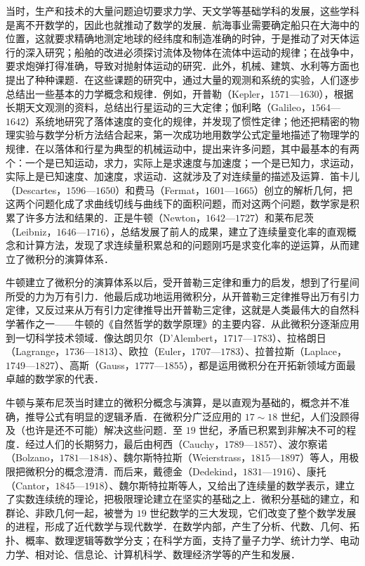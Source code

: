 当时，生产和技术的大量问题迫切要求力学、天文学等基础学科的发展，这些学科是离不开数学的，因此也就推动了数学的发展．航海事业需要确定船只在大海中的位置，这就要求精确地测定地球的经纬度和制造准确的时钟，于是推动了对天体运行的深入研究；船舶的改进必须探讨流体及物体在流体中运动的规律；在战争中，要求炮弹打得准确，导致对抛射体运动的研究．此外，机械、建筑、水利等方面也提出了种种课题．在这些课题的研究中，通过大量的观测和系统的实验，人们逐步总结出一些基本的力学概念和规律．例如，开普勒（Kepler，$1571$—$1630$），根据长期天文观测的资料，总结出行星运动的三大定律；伽利略（Galileo，$1564$—$1642$）系统地研究了落体速度的变化的规律，并发现了惯性定律；他还把精密的物理实验与数学分析方法结合起来，第一次成功地用数学公式定量地描述了物理学的规律．在以落体和行星为典型的机械运动中，提出来许多问题，其中最基本的有两个：一个是已知运动，求力，实际上是求速度与加速度；一个是已知力，求运动，实际上是已知速度、加速度，求运动．这就涉及了对连续量的描述及运算．笛卡儿（Descartes，$1596$—$1650$）和费马（Fermat，$1601$—$1665$）创立的解析几何，把这两个问题化成了求曲线切线与曲线下的面积问题，而对这两个问题，数学家是积累了许多方法和结果的．正是牛顿（Newton，$1642$—$1727$）和莱布尼茨（Leibniz，$1646$—$1716$），总结发展了前人的成果，建立了连续量变化率的直观概念和计算方法，发现了求连续量积累总和的问题刚巧是求变化率的逆运算，从而建立了微积分的演算体系．

牛顿建立了微积分的演算体系以后，受开普勒三定律和重力的启发，想到了行星间所受的力为万有引力．他最后成功地运用微积分，从开普勒三定律推导出万有引力定律，又反过来从万有引力定律推导出开普勒三定律，这就是人类最伟大的自然科学著作之一——牛顿的《自然哲学的数学原理》的主要内容．从此微积分逐渐应用到一切科学技术领域．像达朗贝尔（D'Alembert，$1717$—$1783$）、拉格朗日（Lagrange，$1736$—$1813$）、欧拉（Euler，$1707$—$1783$）、拉普拉斯（Laplace，$1749$—$1827$）、高斯（Gauss，$1777$—$1855$），都是运用微积分在开拓新领域方面最卓越的数学家的代表．

牛顿与莱布尼茨当时建立的微积分概念与演算，是以直观为基础的，概念并不准确，推导公式有明显的逻辑矛盾．在微积分广泛应用的 $17\sim18$ 世纪，人们没顾得及（也许是还不可能）解决这些问题．至 $19$ 世纪，矛盾已积累到非解决不可的程度．经过人们的长期努力，最后由柯西（Cauchy，$1789$—$1857$）、波尔察诺（Bolzano，$1781$—$1848$）、魏尔斯特拉斯（Weierstrass，$1815$—$1897$）等人，用极限把微积分的概念澄清．而后来，戴德金（Dedekind，$1831$—$1916$）、康托（Cantor，$1845$—$1918$）、魏尔斯特拉斯等人，又给出了连续量的数学表示，建立了实数连续统的理论，把极限理论建立在坚实的基础之上．微积分基础的建立，和群论、非欧几何一起，被誉为 $19$ 世纪数学的三大发现，它们改变了整个数学发展的进程，形成了近代数学与现代数学．在数学内部，产生了分析、代数、几何、拓扑、概率、数理逻辑等数学分支；在科学方面，支持了量子力学、统计力学、电动力学、相对论、信息论、计算机科学、数理经济学等的产生和发展．

